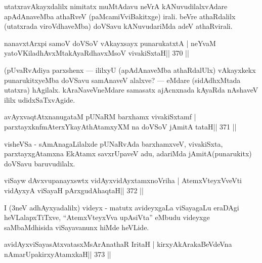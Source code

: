 \begin{artha}
utatxravAkayxdalilx nimitatx muMtAdavu neVrA kANuvudilalxvAdare  apAdAnaveMba athaRveV (paMcamiVviBakitxge) irali. beVre athaRdalilx  (utatxrada viroVdhaveMba) doVSavu kANuvudariMda adeV athaRvirali.
\end{artha}

\begin{shl}
nanavxtArxpi samoV doVSoV vAkayxsayx punarukatxtA |
neYvaM yatoV\s KiladhAvxMtakAyaRdhavxMsoV vivakiSxtaH\hfill || 370 ||
\end{shl}

\begin{artha}
(pUvaRvAdiya parxshenx  {\rm ---}  ililxyU (apAdAnaveMba athaRdalUlx) 
vAkayxkekx punarukitxyeMba doVSavu samAnaveV alalxve?  {\rm ---}  eMdare 
(sidAdhxMtada utatxra) hAgilalx. kAraNaveVneMdare samasatx ajAcnxnada 
kAyaRda nAshaveV ililx udidxSaTxvAgide.
\end{artha}


\begin{shl}
avAyxvaqtAtxnanugataM pUNaRM barxhamx vivakiSxtamf |
parxtayxknfmAterxYkayAthAtamxyXM na doVSoV jAmitA tataH\hfill || 371 ||
\end{shl}

\begin{artha}
visheVSa - sAmAnagaLilalxde pUNaRvAda barxhamxveV, vivakiSxta, parxtayxgAtamxna EkAtamx savxrUpaveV adu, adariMda jAmitA(punarukitx) doVSavu baruvudilalx.
\end{artha}


\begin{shl}
viSayw dAvxvupanayxswtx vidAyxvidAyxtamxnoVriha |
AtemxVteyxVveVti vidAyxyA viSayaH pArxgudAhaqtaH\hfill || 372 ||
\end{shl}

\begin{artha}
I (3neV adhAyxyadalilx) videyx - matutx avideyxgaLa viSayagaLu eraDAgi heVLalapxTiTxve, ``AtemxVteyxVva upAsiVta'' eMbudu videyxge saMbaMdhisida viSayavanunx hiMde heVLide.
\end{artha}

\begin{shl}
avidAyxviSayasAtxvatasxMsArAnathaR IritaH |
kirxyAkArakaBeVdeVna nAmarUpakirxyAtamxkaH\hfill || 373 ||
\end{shl}

